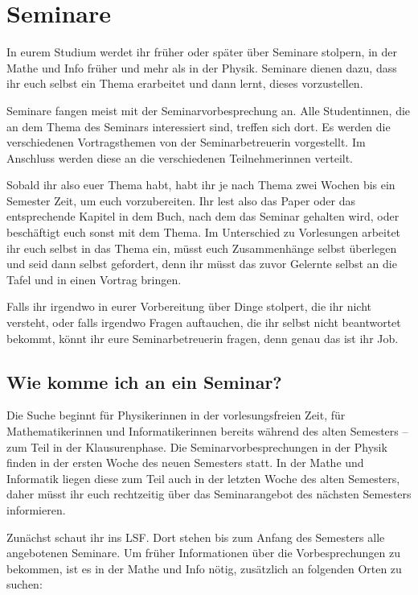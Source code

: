 \section{Seminare}

In eurem Studium werdet ihr früher oder später über Seminare stolpern, in der Mathe und Info früher und mehr als in der Physik. Seminare dienen dazu, dass ihr euch selbst ein Thema erarbeitet und dann lernt, dieses vorzustellen.

Seminare fangen meist mit der Seminarvorbesprechung an. Alle Studentinnen, die an dem Thema des Seminars interessiert sind, treffen sich dort. Es werden die verschiedenen Vortragsthemen von der Seminarbetreuerin vorgestellt. Im Anschluss werden diese an die verschiedenen Teilnehmerinnen verteilt.

Sobald ihr also euer Thema habt, habt ihr je nach Thema zwei Wochen bis ein Semester Zeit, um euch vorzubereiten. Ihr lest also das Paper oder das entsprechende Kapitel in dem Buch, nach dem das Seminar gehalten wird, oder beschäftigt euch sonst mit dem Thema. Im Unterschied zu Vorlesungen arbeitet ihr euch selbst in das Thema ein, müsst euch Zusammenhänge selbst überlegen und seid dann selbst gefordert, denn ihr müsst das zuvor Gelernte selbst an die Tafel und in einen Vortrag bringen.

Falls ihr irgendwo in eurer Vorbereitung über Dinge stolpert, die ihr nicht versteht, oder falls irgendwo Fragen auftauchen, die ihr selbst nicht beantwortet bekommt, könnt ihr eure Seminarbetreuerin fragen, denn genau das ist ihr Job.

\subsection{Wie komme ich an ein Seminar?}

Die Suche beginnt für Physikerinnen in der vorlesungsfreien Zeit, für Mathematikerinnen und Informatikerinnen bereits während des alten Semesters -- zum Teil in der Klausurenphase. Die Seminarvorbesprechungen in der Physik finden in der ersten Woche des neuen Semesters statt. In der Mathe und Informatik liegen diese zum Teil auch in der letzten Woche des alten Semesters, daher müsst ihr euch rechtzeitig über das Seminarangebot des nächsten Semesters informieren.

Zunächst schaut ihr ins LSF. Dort stehen bis zum Anfang des Semesters alle angebotenen Seminare. Um früher Informationen über die Vorbesprechungen zu bekommen, ist es in der Mathe und Info nötig, zusätzlich an folgenden Orten zu suchen:


